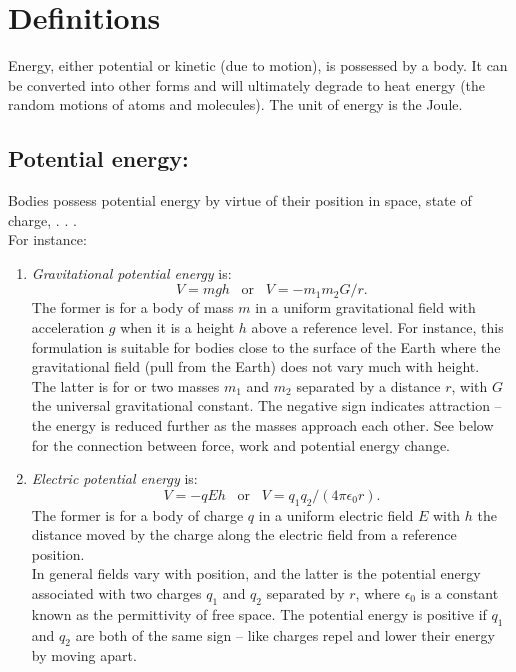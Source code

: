 




\addtolength{\topmargin}{-0.7 cm}
\setlength{\columnsep}{22pt}

\section{Definitions}
Energy, either potential or kinetic (due to motion), is possessed by a body.  It can be converted into other forms and will ultimately degrade to heat energy (the random motions of atoms and molecules).  The unit of energy is the Joule.
\subsection{Potential energy:}Bodies possess potential energy by virtue of their position in space, state of charge, . . .\\
For instance:
\begin{enumerate}
  \item \textit{Gravitational potential energy} is:
    \begin{equation*} V = m g h \;\;\; \textrm{or} \;\;\; V = - m_1m_2 G/r.
\end{equation*}
The former is for a body of mass $m$ in a uniform gravitational field with acceleration $g$ when it is a height $h$ above a reference level.  For instance, this formulation is suitable for bodies close to the surface of the Earth where the gravitational field (pull from the Earth) does not vary much with height.\\
The latter is for or two masses $m_1$ and $m_2$ separated by a distance $r$, with $G$ the universal gravitational constant.  The negative sign indicates attraction -- the energy is reduced further as the masses approach each other.  See below for the connection between force, work and potential energy change.
  \item \textit{Electric potential energy} is:
   \begin{equation*} V = - q E h \;\;\; \textrm{or} \;\;\; V = q_1q_2/(4\pi \epsilon_0 r).
\end{equation*} The former is for a body of charge $q$ in a uniform electric field $E$ with $h$ the distance moved by the charge along the electric field from a reference position.\\
In general fields vary with position, and the latter is the potential energy associated with two charges $q_1$ and $q_2$ separated by $r$, where $\epsilon_0$ is a constant known as the permittivity of free space.  The potential energy is positive if $q_1$ and $q_2$ are both of the same sign -- like charges repel and lower their energy by moving apart.
\end{enumerate}
